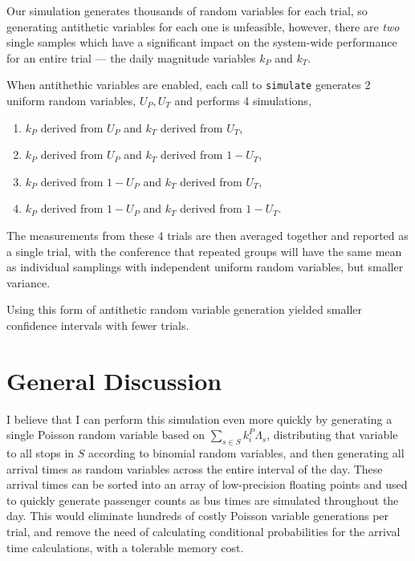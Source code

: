 \documentclass[12pt]{article}
\theoremstyle{definition}
\begin{document}
Our simulation generates thousands of random variables for each trial, so
generating antithetic variables for each one is unfeasible, however, there are
\emph{two} single samples which have a significant impact on the system-wide
performance for an entire trial --- the daily magnitude variables $k_P$ and
$k_T$.

When antithethic variables are enabled, each call to \texttt{simulate}
generates 2 uniform random variables, $U_P, U_T$ and performs 4 simulations,
\begin{enumerate}
    \item $k_P$ derived from $U_P$ and $k_T$ derived from $U_T$,
    \item $k_P$ derived from $U_P$ and $k_T$ derived from $1 - U_T$,
    \item $k_P$ derived from $1 - U_P$ and $k_T$ derived from $U_T$,
    \item $k_P$ derived from $1 - U_P$ and $k_T$ derived from $1 - U_T$.
\end{enumerate}

The measurements from these 4 trials are then averaged together and reported
as a single trial, with the conference that repeated groups will have the same
mean as individual samplings with independent uniform random variables, but
smaller variance.

Using this form of antithetic random variable generation yielded smaller
confidence intervals with fewer trials.

\section{General Discussion}

I believe that I can perform this simulation even more quickly by generating a
single Poisson random variable based on $\sum_{s \in S}k^P_i\Lambda_s$,
distributing that variable to all stops in $S$ according to binomial random
variables, and then generating all arrival times as random variables across
the entire interval of the day. These arrival times can be sorted into an array
of low-precision floating points and used to quickly generate passenger counts
as bus times are simulated throughout the day. This would eliminate hundreds of
costly Poisson variable generations per trial, and remove the need of
calculating conditional probabilities for the arrival time calculations, with
a tolerable memory cost.

\printbibliography
\end{document}

